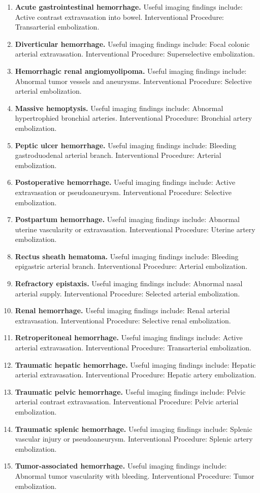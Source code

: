 \begin{enumerate}[leftmargin=*,itemsep=0.45em,topsep=0.4em]
\item \textbf{Acute gastrointestinal hemorrhage.} Useful imaging findings include: Active contrast extravasation into bowel. Interventional Procedure: Transarterial embolization.
\item \textbf{Diverticular hemorrhage.} Useful imaging findings include: Focal colonic arterial extravasation. Interventional Procedure: Superselective embolization.
\item \textbf{Hemorrhagic renal angiomyolipoma.} Useful imaging findings include: Abnormal tumor vessels and aneurysms. Interventional Procedure: Selective arterial embolization.
\item \textbf{Massive hemoptysis.} Useful imaging findings include: Abnormal hypertrophied bronchial arteries. Interventional Procedure: Bronchial artery embolization.
\item \textbf{Peptic ulcer hemorrhage.} Useful imaging findings include: Bleeding gastroduodenal arterial branch. Interventional Procedure: Arterial embolization.
\item \textbf{Postoperative hemorrhage.} Useful imaging findings include: Active extravasation or pseudoaneurysm. Interventional Procedure: Selective embolization.
\item \textbf{Postpartum hemorrhage.} Useful imaging findings include: Abnormal uterine vascularity or extravasation. Interventional Procedure: Uterine artery embolization.
\item \textbf{Rectus sheath hematoma.} Useful imaging findings include: Bleeding epigastric arterial branch. Interventional Procedure: Arterial embolization.
\item \textbf{Refractory epistaxis.} Useful imaging findings include: Abnormal nasal arterial supply. Interventional Procedure: Selected arterial embolization.
\item \textbf{Renal hemorrhage.} Useful imaging findings include: Renal arterial extravasation. Interventional Procedure: Selective renal embolization.
\item \textbf{Retroperitoneal hemorrhage.} Useful imaging findings include: Active arterial extravasation. Interventional Procedure: Transarterial embolization.
\item \textbf{Traumatic hepatic hemorrhage.} Useful imaging findings include: Hepatic arterial extravasation. Interventional Procedure: Hepatic artery embolization.
\item \textbf{Traumatic pelvic hemorrhage.} Useful imaging findings include: Pelvic arterial contrast extravasation. Interventional Procedure: Pelvic arterial embolization.
\item \textbf{Traumatic splenic hemorrhage.} Useful imaging findings include: Splenic vascular injury or pseudoaneurysm. Interventional Procedure: Splenic artery embolization.
\item \textbf{Tumor-associated hemorrhage.} Useful imaging findings include: Abnormal tumor vascularity with bleeding. Interventional Procedure: Tumor embolization.
\end{enumerate}

